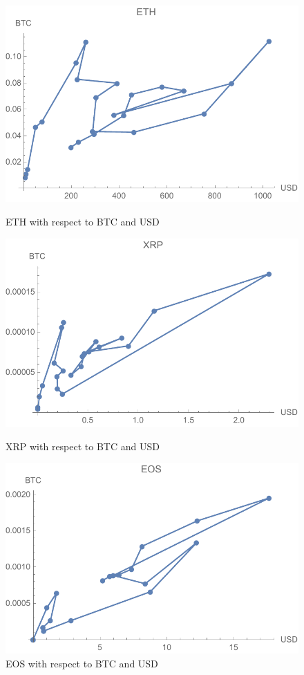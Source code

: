 \begin{figure}[!htb]
	\includegraphics[width=\linewidth]{figures/eth.pdf}
	\caption{ETH with respect to BTC and USD}\label{fig:eth}
	\endminipage\hfill
	\includegraphics[width=\linewidth]{figures/xrp.pdf}
	\caption{XRP with respect to BTC and USD}\label{fig:xrp}
	\endminipage\hfill
	\includegraphics[width=\linewidth]{figures/eos.pdf}
	\caption{EOS with respect to BTC and USD}\label{fig:eos}
	\endminipage
\end{figure}

